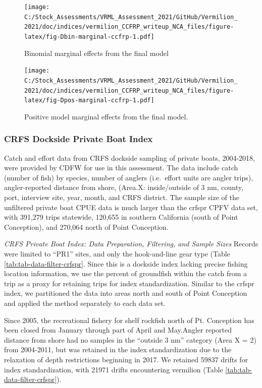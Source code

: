 \documentclass[11pt,
  english,
  a4paper,
]{article}
\begin{document}
\begin{figure}
\centering
\texttt{[image: C:/Stock\_Assessments/VRML\_Assessment\_2021/GitHub/Vermilion\_2021/doc/indices/vermilion\_CCFRP\_writeup\_NCA\_files/figure-latex/fig-Dbin-marginal-ccfrp-1.pdf]}
\caption{\label{fig:fig-Dbin-marginal-ccfrp}Binomial marginal effects from the final model}
\end{figure}

\begin{figure}
\centering
\texttt{[image: C:/Stock\_Assessments/VRML\_Assessment\_2021/GitHub/Vermilion\_2021/doc/indices/vermilion\_CCFRP\_writeup\_NCA\_files/figure-latex/fig-Dpos-marginal-ccfrp-1.pdf]}
\caption{\label{fig:fig-Dpos-marginal-ccfrp}Positive model marginal effects from the final model.}
\end{figure}


\hypertarget{crfs-dockside-private-boat-index}{%
\subsubsection{CRFS Dockside Private Boat Index}\label{crfs-dockside-private-boat-index}}

\leavevmode\tagmcend\tagstructend

Catch and effort data from CRFS dockside sampling of private boats, 2004-2018, were provided by CDFW for use in this assessment. The data include catch (number of fish) by species, number of anglers (i.e.~effort units are angler trips), angler-reported distance from shore, (Area.X: inside/outside of 3 nm, county, port, interview site, year, month, and CRFS district. The sample size of the unfiltered private boat CPUE data is much larger than the crfspr CPFV data set, with 391,279 trips statewide, 120,655 in southern California (south of Point Conception), and 270,064 north of Point Conception.

\emph{CRFS Private Boat Index: Data Preparation, Filtering, and Sample Sizes} Records were limited to ``PR1'' sites, and only the hook-and-line gear type (Table \ref{tab:tab-data-filter-crfspr}. Since this is a dockside index lacking precise fishing location information, we use the percent of groundfish within the catch from a trip as a proxy for retaining trips for index standardization. Similar to the crfspr index, we partitioned the data into areas north and south of Point Conception and applied the method separately to each data set.

Since 2005, the recreational fishery for shelf rockfish north of Pt. Conception has been closed from January through part of April and May.Angler reported distance from shore had no samples in the ``outside 3 nm'' category (Area X = 2) from 2004-2011, but was retained in the index standardization due to the relaxation of depth restrictions beginning in 2017. We retained 59837 drifts for index standardization, with 21971 drifts encountering vermilion (Table \ref{tab:tab-data-filter-crfspr}).
\end{document}
